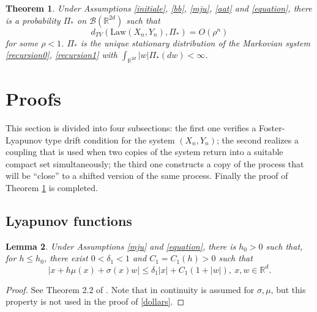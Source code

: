\documentclass{article}
\newtheorem{theorem}{Theorem}%
\newtheorem{lemma}[theorem]{Lemma}
\begin{document}
\begin{theorem}\label{main}
Under Assumptions \ref{initiale}, \ref{bb}, \ref{mju}, \ref{aat} and \ref{equation}, there is a probability 
$\Pi_*$ on
$\mathcal{B}(\mathbb{R}^{2d})$ such that 
\begin{equation}\label{totale}
d_{TV}(\mathrm{Law}(X_{n},Y_{n}), \Pi_*)=O(\rho^n)	
\end{equation} for some $\rho<1$. $\Pi_{*}$ is the unique stationary distribution	
of the Markovian system \eqref{recursion0}, \eqref{recursion1} with $\int_{\mathbb{R}^{2d}}|w|\Pi_{*}(dw)<\infty$.
\end{theorem}


\section{Proofs}\label{proo}

This section is divided into four subsections: the first one verifies a Foster-Lyapunov
type drift condition for the system $(X_n,Y_n)$; the second realizes a
coupling that is used when two copies of the system return into a suitable compact
set simultaneously; the third one constructs a copy of the process that will be ``close''
to a shifted version of the same process. 
Finally the proof of Theorem \ref{main} is completed.


\subsection{Lyapunov functions}


\begin{lemma}\label{varv} Under Assumptions \ref{mju} and \ref{equation}, there is $h_0>0$ such that,
for $h\leq h_0$,
there exist $0<\delta_1<1$ and $C_1=C_1(h)>0$ such that
\begin{equation}\label{dollars}
|x+h\mu(x)+\sigma(x)w|\leq \delta_1 |x|+C_1(1+|w|),\ x,w\in\mathbb{R}^d.
\end{equation}
\end{lemma}
\begin{proof}
See Theorem 2.2 of \cite{varvenne,varvenne1}. 
Note that in \cite{varvenne} continuity is assumed for $\sigma,\mu$, but this
property is not used in the proof of \eqref{dollars}.
\end{proof}
\end{document}
